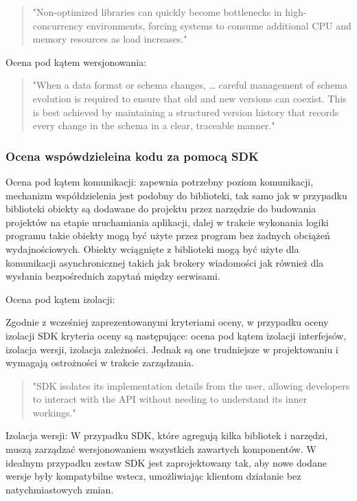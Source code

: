 \documentclass[runningheads,12pt]{llncs}
\begin{document}
\begin{quote}
    "Non-optimized libraries can quickly become bottlenecks in high-concurrency environments, forcing systems to consume additional CPU and memory resources as load increases." ~\cite[p. 192]{fowler2012patterns}
\end{quote}

Ocena pod kątem wersjonowania:

\begin{quote}
    "When a data format or schema changes, … careful management of schema evolution is required to ensure that old and new versions can coexist. This is best achieved by maintaining a structured version history that records every change in the schema in a clear, traceable manner." ~\cite[p. 111]{kleppmann2017designing}
\end{quote}

\subsubsection{Ocena wspówdzieleina kodu za pomocą SDK}

Ocena pod kątem komunikacji: zapewnia potrzebny poziom komunikacji, mechanizm współdzielenia jest podobny do biblioteki, tak samo jak w przypadku biblioteki obiekty są dodawane do projektu przez narzędzie do budowania projektów na etapie uruchamiania aplikacji, dalej w trakcie wykonania logiki programu takie obiekty mogą być użyte przez program bez żadnych obciążeń wydajnościowych. Obiekty wciągnięte z biblioteki mogą być użyte dla komunikacji asynchronicznej takich jak brokery wiadomości jak również dla wysłania bezpośrednich zapytań między serwisami.

Ocena pod kątem izolacji: 

Zgodnie z wcześniej zaprezentowanymi kryteriami oceny, w przypadku oceny izolacji SDK kryteria oceny są następujące: ocena pod kątem izolacji interfejsów, izolacja wersji, izolacja zależności. Jednak są one trudniejsze w projektowaniu i wymagają ostrożności w trakcie zarządzania.

\begin{quote}
    "SDK isolates its implementation details from the user, allowing developers to interact with the API without needing to understand its inner workings." ~\cite[p. 75]{Essential}
\end{quote}

Izolacja wersji: W przypadku SDK, które agregują kilka bibliotek i narzędzi, muszą zarządzać wersjonowaniem wszystkich zawartych komponentów. W idealnym przypadku zestaw SDK jest zaprojektowany tak, aby nowe dodane wersje były kompatybilne wstecz, umożliwiając klientom działanie bez natychmiastowych zmian.
\end{document}
